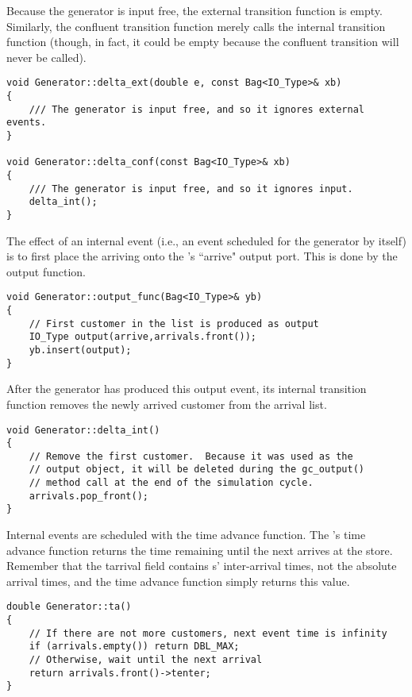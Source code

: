 Because the generator is input free, the external transition function is empty. Similarly, the confluent transition function merely calls the internal transition function (though, in fact, it could be empty because the confluent transition will never be called).
\begin{verbatim}
void Generator::delta_ext(double e, const Bag<IO_Type>& xb)
{
    /// The generator is input free, and so it ignores external events.
}

void Generator::delta_conf(const Bag<IO_Type>& xb)
{
    /// The generator is input free, and so it ignores input.
    delta_int();
}
\end{verbatim}

The effect of an internal event (i.e., an event scheduled for the generator by itself) is to first place the arriving  onto the 's ``arrive" output port. This is done by the output function.
\begin{verbatim}
void Generator::output_func(Bag<IO_Type>& yb)
{
    // First customer in the list is produced as output
    IO_Type output(arrive,arrivals.front());
    yb.insert(output);
}
\end{verbatim}
After the generator has produced this output event, its internal transition function removes the newly arrived customer from the arrival list.
\begin{verbatim}
void Generator::delta_int()
{
    // Remove the first customer.  Because it was used as the
    // output object, it will be deleted during the gc_output()
    // method call at the end of the simulation cycle.
    arrivals.pop_front();
}
\end{verbatim}

Internal events are scheduled with the time advance function. The 's time advance function returns the time remaining until the next  arrives at the store. Remember that the tarrival field contains s' inter-arrival times, not the absolute arrival times, and the time advance function simply returns this value.
\begin{verbatim}
double Generator::ta()
{
    // If there are not more customers, next event time is infinity
    if (arrivals.empty()) return DBL_MAX;
    // Otherwise, wait until the next arrival
    return arrivals.front()->tenter;
}
\end{verbatim}

